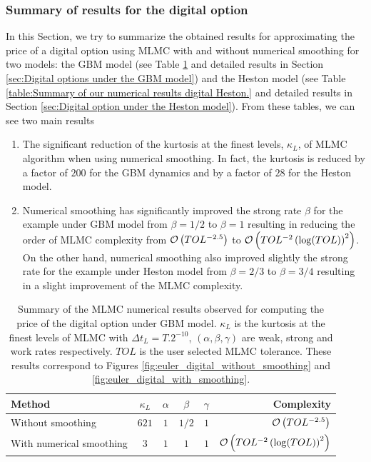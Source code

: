 \subsubsection{Summary of results for the digital option}\label{sec:Summary of results for the digital option}
In this Section, we try to summarize the obtained results for approximating the price of a digital option using MLMC with and without numerical smoothing for two models: the GBM model (see Table \ref{table:Summary of our numerical results digital GBM.} and  detailed results in Section \ref{sec:Digital options under the GBM model}) and the Heston model (see Table \ref{table:Summary of our numerical results digital Heston.} and  detailed results in Section \ref{sec:Digital option under the Heston model}). From these tables, we can see two main results
\begin{enumerate}
\item The significant reduction of the kurtosis at the finest levels, $\kappa_{L}$, of MLMC algorithm when using numerical smoothing. In fact, the kurtosis is reduced by a factor of $200$ for the GBM dynamics and by a factor of $28$  for the Heston model.
\item Numerical smoothing has significantly improved the strong rate $\beta$ for the example under GBM model from $\beta=1/2$ to $\beta=1$ resulting in reducing the order of MLMC complexity from ${\mathcal{O}}\left(TOL^{-2.5}\right)$ to ${\mathcal{O}}\left(TOL^{-2} \left(\log(TOL)\right)^2\right)$. On the other hand, numerical smoothing also improved slightly the strong rate for  the example under Heston model from $\beta=2/3$ to $\beta=3/4$ resulting in a slight improvement of the MLMC complexity.
\end{enumerate}

\FloatBarrier
\begin{table}[!h]
	\centering
	\begin{small}
	\begin{tabular}{l*{4}{c}r}
	\toprule[1.5pt]
		Method      &   $\kappa_{L}$  & $\alpha$  & $\beta$  &  $\gamma$   & Complexity \\
		\hline
			Without smoothing & $621$& $1$ & $1/2$ & $1$&  ${\mathcal{O}}\left(TOL^{-2.5}\right)$ \\	
              \hline
           With numerical smoothing   & $3$& $1$ & $1$ & $1$&  ${\mathcal{O}}\left(TOL^{-2} \left(\log(TOL)\right)^2\right)$ \\
		\bottomrule[1.25pt]
	\end{tabular}
\end{small}
	\caption{Summary of the MLMC numerical results observed for  computing the price of the digital option under GBM model. $\kappa_{L}$ is the kurtosis at the finest levels of MLMC with $\Delta t_{L}=T.2^{-10}$, $(\alpha,\beta,\gamma)$ are weak, strong and work rates respectively. $TOL$ is the user selected  MLMC  tolerance. These results correspond to Figures \ref{fig:euler_digital_without_smoothing} and \ref{fig:euler_digital_with_smoothing}.}
	\label{table:Summary of our numerical results digital GBM.}
\end{table}
\FloatBarrier

